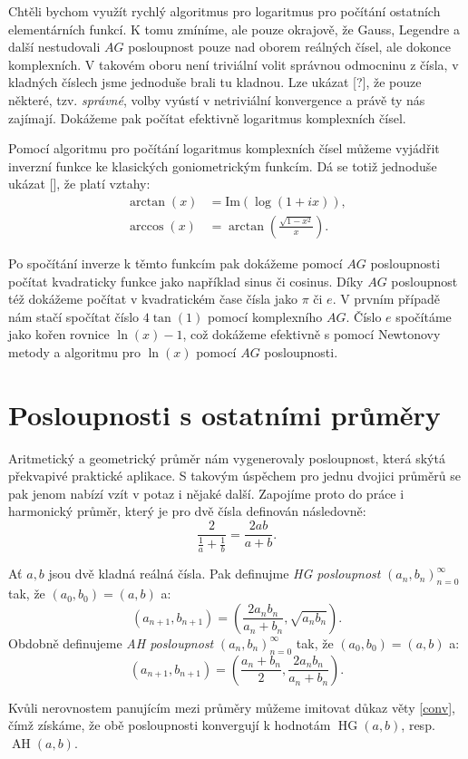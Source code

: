 \documentclass[12pt]{report}
\DeclareMathOperator{\HG}{HG}
\DeclareMathOperator{\AH}{AH}
\begin{document}
Chtěli bychom využít rychlý algoritmus pro logaritmus pro počítání ostatních elementárních funkcí. K tomu zmíníme, ale pouze okrajově, že Gauss, Legendre a další nestudovali $AG$ posloupnost pouze nad oborem reálných čísel, ale dokonce komplexních. V takovém oboru není triviální volit správnou odmocninu z čísla, v kladných číslech jsme jednoduše brali tu kladnou. Lze ukázat [?], že pouze některé, tzv. \textit{správné}, volby vyústí v netriviální konvergence a právě ty nás zajímají. Dokážeme pak počítat efektivně logaritmus komplexních čísel.  

Pomocí algoritmu pro počítání logaritmus komplexních čísel můžeme vyjádřit inverzní funkce ke klasických goniometrickým funkcím. Dá se totiž jednoduše ukázat [], že platí vztahy:
\begin{align*}
\arctan (x) &= \textrm{Im}(\log(1+ix)),\\
\arccos (x) &= \arctan\left(\frac{\sqrt{1-x^2}}{x} \right).
\end{align*}

Po spočítání inverze k těmto funkcím pak dokážeme pomocí $AG$ posloupnosti počítat kvadraticky funkce jako například sinus či cosinus. Díky $AG$ posloupnost též dokážeme počítat v kvadratickém čase čísla jako $\pi$ či $e$. V prvním případě nám stačí spočítat číslo $4\tan(1)$ pomocí komplexního $AG$. Číslo $e$ spočítáme jako kořen rovnice $\ln(x) - 1$, což dokážeme efektivně s pomocí Newtonovy metody a algoritmu pro $\ln(x)$ pomocí $AG$ posloupnosti.

\section{Posloupnosti s ostatními průměry}

Aritmetický a geometrický průměr nám vygenerovaly posloupnost, která skýtá překvapivé praktické aplikace. S takovým úspěchem pro jednu dvojici průměrů se pak jenom nabízí vzít v potaz i nějaké další. Zapojíme proto do práce i harmonický průměr, který je pro dvě čísla definován následovně:
$$\frac{2}{\frac{1}{a}+\frac{1}{b}} = \frac{2ab}{a+b}.$$

\begin{definice}
Ať $a,b$ jsou dvě kladná reálná čísla. Pak definujme \textit{HG posloupnost} $(a_n,b_n)_{n=0}^{\infty}$ tak, že $(a_0,b_0) = (a,b)$ a:
$$\left(a_{n+1},b_{n+1} \right) = \left( \frac{2 a_n b_n}{a_n+b_n} , \sqrt{a_n b_n} \right).$$
Obdobně definujeme \textit{AH posloupnost}  $(a_n,b_n)_{n=0}^{\infty}$ tak, že $(a_0,b_0) = (a,b)$ a:
$$\left(a_{n+1},b_{n+1} \right) = \left( \frac{a_n+b_n}{2}, \frac{2 a_n b_n}{a_n+b_n} \right).$$
\end{definice}
Kvůli nerovnostem panujícím mezi průměry můžeme imitovat důkaz věty \ref{conv}, čímž získáme, že obě posloupnosti konvergují k hodnotám $\HG(a,b)$, resp. $\AH(a,b)$.
\end{document}
